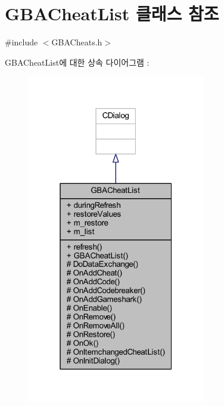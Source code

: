 \hypertarget{class_g_b_a_cheat_list}{}\section{G\+B\+A\+Cheat\+List 클래스 참조}
\label{class_g_b_a_cheat_list}


{\ttfamily \#include $<$G\+B\+A\+Cheats.\+h$>$}



G\+B\+A\+Cheat\+List에 대한 상속 다이어그램 \+: \nopagebreak
\begin{figure}[H]
\begin{center}
\leavevmode
\includegraphics[width=220pt]{class_g_b_a_cheat_list__inherit__graph}
\end{center}
\end{figure}


